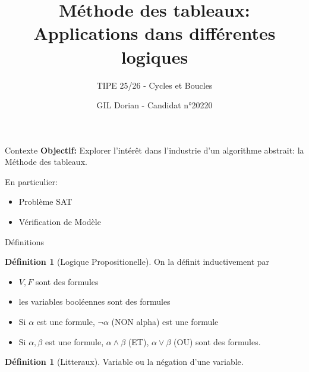 \documentclass{beamer}
\title{Méthode des tableaux: Applications dans différentes logiques}
\author{GIL Dorian - Candidat n°20220}
\subtitle{TIPE 25/26 - Cycles et Boucles}
\date{}
\theoremstyle{definition}
\newtheorem{mydef}[theorem]{Définition}
\begin{document}
\begin{frame}
\titlepage
\end{frame}

\begin{frame}{Contexte}
    \textbf{Objectif:} Explorer l'intérêt dans l'industrie d'un algorithme abstrait: la Méthode des tableaux.
    \pause
    \vspace{10px}
    
    En particulier:
    \begin{itemize}
        \item Problème SAT
        \item Vérification de Modèle
    \end{itemize}
\end{frame}

\begin{frame}{Définitions}
    \begin{mydef}[Logique Propositionelle]
        On la définit inductivement par
        \begin{itemize}
            \item $V, F$ sont des formules
            \item les variables booléennes sont des formules
            \item Si $\alpha$ est une formule, $\lnot\alpha$ (NON alpha) est une formule
            \item Si $\alpha, \beta$ est une formule, $\alpha\land\beta$ (ET), $\alpha\lor\beta$ (OU) sont des formules.
        \end{itemize}
    \end{mydef}
    \begin{mydef}[Litteraux]
        Variable ou la négation d'une variable.
    \end{mydef}

\end{frame}
\end{document}
